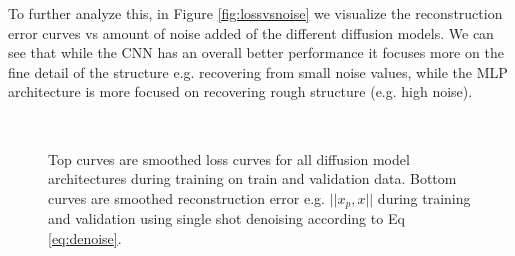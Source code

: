 To further analyze this, in Figure \ref{fig:lossvsnoise} we visualize the reconstruction error curves vs amount of noise added of the different diffusion models. We can see that while the CNN has an overall better performance it focuses more on the fine detail of the structure e.g. recovering from small noise values, while the MLP architecture is more focused on recovering rough structure (e.g. high noise). 
\begin{figure}
  \centering
     \\


  \caption{Top curves are smoothed loss curves for all diffusion model architectures during training on train and validation data. Bottom curves are smoothed reconstruction error e.g. $||x_p,x||$ during training and validation using single shot denoising according to Eq \ref{eq:denoise}.}
  \label{fig:losscurvesall}
\end{figure}

